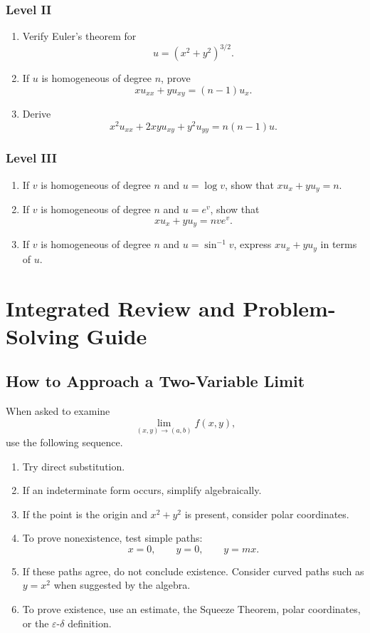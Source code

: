 \documentclass[11pt,oneside]{book}
\theoremstyle{studentthm}
\theoremstyle{definition}
\newcommand{\eps}{\varepsilon}
\begin{document}
\subsection*{Level II}
\begin{enumerate}
\item Verify Euler's theorem for
\[
u=(x^2+y^2)^{3/2}.
\]
\item If \(u\) is homogeneous of degree \(n\), prove
\[
xu_{xx}+yu_{xy}=(n-1)u_x.
\]
\item Derive
\[
x^2u_{xx}+2xyu_{xy}+y^2u_{yy}=n(n-1)u.
\]
\end{enumerate}

\subsection*{Level III}
\begin{enumerate}
\item If \(v\) is homogeneous of degree \(n\) and \(u=\log v\),
show that \(xu_x+yu_y=n\).
\item If \(v\) is homogeneous of degree \(n\) and \(u=e^v\), show
that
\[
xu_x+yu_y=nve^v.
\]
\item If \(v\) is homogeneous of degree \(n\) and
\(u=\sin^{-1}v\), express \(xu_x+yu_y\) in terms of \(u\).
\end{enumerate}

\chapter{Integrated Review and Problem-Solving Guide}

\section{How to Approach a Two-Variable Limit}

When asked to examine
\[
\lim_{(x,y)\to(a,b)}f(x,y),
\]
use the following sequence.

\begin{enumerate}
\item Try direct substitution.
\item If an indeterminate form occurs, simplify algebraically.
\item If the point is the origin and \(x^2+y^2\) is present, consider
polar coordinates.
\item To prove nonexistence, test simple paths:
\[
x=0,\qquad y=0,\qquad y=mx.
\]
\item If these paths agree, do not conclude existence. Consider curved
paths such as \(y=x^2\) when suggested by the algebra.
\item To prove existence, use an estimate, the Squeeze Theorem, polar
coordinates, or the \(\eps\)-\(\delta\) definition.
\end{enumerate}
\end{document}
